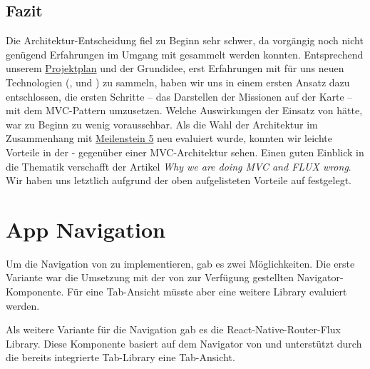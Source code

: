 \subsection{Fazit}
Die Architektur-Entscheidung fiel zu Beginn sehr schwer, da vorgängig noch nicht genügend Erfahrungen im Umgang mit  gesammelt werden konnten.
Entsprechend unserem \hyperref[pm-projektplan]{Projektplan} und der Grundidee, erst Erfahrungen mit für uns neuen Technologien (,  und ) zu sammeln, haben wir uns in einem ersten Ansatz dazu entschlossen, die ersten Schritte -- das Darstellen der Missionen auf der Karte -- mit dem \gls{MVC}-Pattern umzusetzen.
Welche Auswirkungen der Einsatz von  hätte, war zu Beginn zu wenig voraussehbar.\newline
Als die Wahl der Architektur im Zusammenhang mit \hyperref[pm-ms5]{Meilenstein 5} neu evaluiert wurde, konnten wir leichte Vorteile in der - gegenüber einer MVC-Architektur sehen.
Einen guten Einblick in die Thematik verschafft der Artikel \emph{Why we are doing MVC and FLUX wrong}\cite{mvc-vs-flux}.\newline
Wir haben uns letztlich aufgrund der oben aufgelisteten Vorteile auf  festgelegt.

\section{App Navigation}
Um die Navigation von \kort{} zu implementieren, gab es zwei Möglichkeiten. 
Die erste Variante war die Umsetzung mit der von  zur Verfügung gestellten Navigator-Komponente. 
Für eine Tab-Ansicht müsste aber eine weitere \gls{Library} evaluiert werden. 

Als weitere Variante für die Navigation gab es die React-Native-Router-Flux Library. 
Diese Komponente basiert auf dem Navigator von  und unterstützt durch die bereits integrierte Tab-Library eine Tab-Ansicht.  

